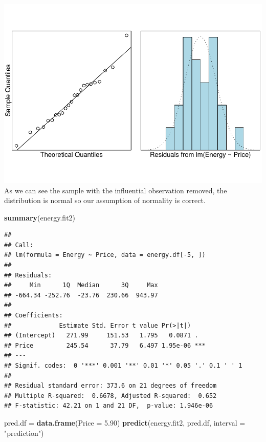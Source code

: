 \documentclass[]{article}
\newenvironment{Shaded}{\begin{snugshade}}{\end{snugshade}}
\newcommand{\DataTypeTok}[1]{\textcolor[rgb]{0.13,0.29,0.53}{#1}}
\newcommand{\FloatTok}[1]{\textcolor[rgb]{0.00,0.00,0.81}{#1}}
\newcommand{\KeywordTok}[1]{\textcolor[rgb]{0.13,0.29,0.53}{\textbf{#1}}}
\newcommand{\NormalTok}[1]{#1}
\newcommand{\StringTok}[1]{\textcolor[rgb]{0.31,0.60,0.02}{#1}}
\begin{document}
\includegraphics{Engsci211assignment2_task2_files/figure-latex/unnamed-chunk-6-1.pdf}
As we can see the sample with the influential observation removed, the
distribution is normal so our assumption of normality is correct.

\begin{Shaded}
\begin{Highlighting}[]
\KeywordTok{summary}\NormalTok{(energy.fit2)}
\end{Highlighting}
\end{Shaded}

\begin{verbatim}
## 
## Call:
## lm(formula = Energy ~ Price, data = energy.df[-5, ])
## 
## Residuals:
##     Min      1Q  Median      3Q     Max 
## -664.34 -252.76  -23.76  230.66  943.97 
## 
## Coefficients:
##             Estimate Std. Error t value Pr(>|t|)    
## (Intercept)   271.99     151.53   1.795   0.0871 .  
## Price         245.54      37.79   6.497 1.95e-06 ***
## ---
## Signif. codes:  0 '***' 0.001 '**' 0.01 '*' 0.05 '.' 0.1 ' ' 1
## 
## Residual standard error: 373.6 on 21 degrees of freedom
## Multiple R-squared:  0.6678, Adjusted R-squared:  0.652 
## F-statistic: 42.21 on 1 and 21 DF,  p-value: 1.946e-06
\end{verbatim}

\begin{Shaded}
\begin{Highlighting}[]
\NormalTok{pred.df =}\StringTok{ }\KeywordTok{data.frame}\NormalTok{(}\DataTypeTok{Price =} \FloatTok{5.90}\NormalTok{)}
\KeywordTok{predict}\NormalTok{(energy.fit2, pred.df, }\DataTypeTok{interval =} \StringTok{"prediction"}\NormalTok{)}
\end{Highlighting}
\end{Shaded}
\end{document}
